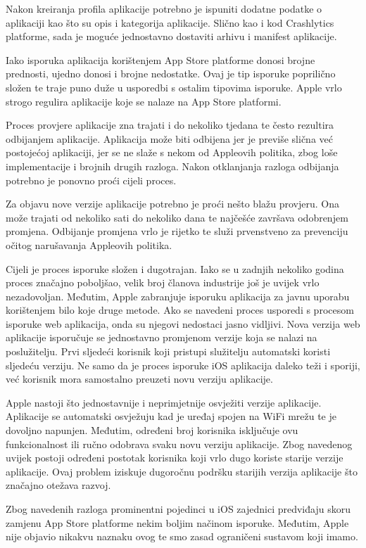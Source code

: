 \documentclass[times, utf8, diplomski, numeric]{fer}
\begin{document}
Nakon kreiranja profila aplikacije potrebno je ispuniti dodatne podatke o aplikaciji kao što su opis i kategorija aplikacije. Slično kao i kod Crashlytics platforme, sada je moguće jednostavno dostaviti arhivu i manifest aplikacije.

Iako isporuka aplikacija korištenjem App Store platforme donosi brojne prednosti, ujedno donosi i brojne nedostatke. Ovaj je tip isporuke poprilično složen te traje puno duže u usporedbi s ostalim tipovima isporuke. Apple vrlo strogo regulira aplikacije koje se nalaze na App Store platformi.

Proces provjere aplikacije zna trajati i do nekoliko tjedana te često rezultira odbijanjem aplikacije. Aplikacija može biti odbijena jer je previše slična već postojećoj aplikaciji, jer se ne slaže s nekom od Appleovih politika, zbog loše implementacije i brojnih drugih razloga. Nakon otklanjanja razloga odbijanja potrebno je ponovno proći cijeli proces.

Za objavu nove verzije aplikacije potrebno je proći nešto blažu provjeru. Ona može trajati od nekoliko sati do nekoliko dana te najčešće završava odobrenjem promjena. Odbijanje promjena vrlo je rijetko te služi prvenstveno za prevenciju očitog narušavanja Appleovih politika.

Cijeli je proces isporuke složen i dugotrajan. Iako se u zadnjih nekoliko godina proces značajno poboljšao, velik broj članova industrije još je uvijek vrlo nezadovoljan. Međutim, Apple zabranjuje isporuku aplikacija za javnu uporabu korištenjem bilo koje druge metode. Ako se navedeni proces usporedi s procesom isporuke web aplikacija, onda su njegovi nedostaci jasno vidljivi. Nova verzija web aplikacije isporučuje se jednostavno promjenom verzije koja se nalazi na poslužitelju. Prvi sljedeći korisnik koji pristupi služitelju automatski koristi sljedeću verziju. Ne samo da je proces isporuke iOS aplikacija daleko teži i sporiji, već korisnik mora samostalno preuzeti novu verziju aplikacije.

Apple nastoji što jednostavnije i neprimjetnije osvježiti verzije aplikacije. Aplikacije se automatski osvježuju kad je uređaj spojen na WiFi mrežu te je dovoljno napunjen. Međutim, određeni broj korisnika isključuje ovu funkcionalnost ili ručno odobrava svaku novu verziju aplikacije. Zbog navedenog uvijek postoji određeni postotak korisnika koji vrlo dugo koriste starije verzije aplikacije. Ovaj problem iziskuje dugoročnu podršku starijih verzija aplikacije što značajno otežava razvoj.

Zbog navedenih razloga prominentni pojedinci u iOS zajednici predviđaju skoru zamjenu App Store platforme nekim boljim načinom isporuke. Međutim, Apple nije objavio nikakvu naznaku ovog te smo zasad ograničeni sustavom koji imamo.
\end{document}
